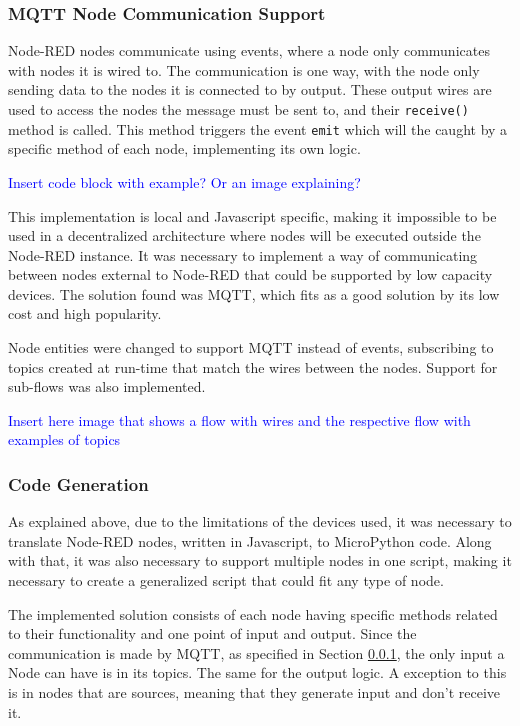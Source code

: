 \subsubsection{MQTT Node Communication Support}\label{sec:mqtt_support}

Node-RED nodes communicate using events, where a node only communicates with nodes it is wired to. The communication is one way, with the node only sending data to the nodes it is connected to by output. These output wires are used to access the nodes the message must be sent to, and their \texttt{receive()} method is called. This method triggers the event \texttt{emit} which will the caught by a specific method of each node, implementing its own logic.

\textcolor{blue}{Insert code block with example? Or an image explaining?}

This implementation is local and Javascript specific, making it impossible to be used in a decentralized architecture where nodes will be executed outside the Node-RED instance. It was necessary to implement a way of communicating between nodes external to Node-RED that could be supported by low capacity devices. The solution found was MQTT, which fits as a good solution by its low cost and high popularity.

Node entities were changed to support MQTT instead of events, subscribing to topics created at run-time that match the wires between the nodes. Support for sub-flows was also implemented.

\textcolor{blue}{Insert here image that shows a flow with wires and the respective flow with examples of topics}

\subsubsection{Code Generation}\label{sec:code_generation}

As explained above, due to the limitations of the devices used, it was necessary to translate Node-RED nodes, written in Javascript, to MicroPython code. Along with that, it was also necessary to support multiple nodes in one script, making it necessary to create a generalized script that could fit any type of node.

The implemented solution consists of each node having specific methods related to their functionality and one point of input and output. Since the communication is made by MQTT, as specified in Section \ref{sec:mqtt_support}, the only input a Node can have is in its topics. The same for the output logic. A exception to this is in nodes that are sources, meaning that they generate input and don't receive it. 

